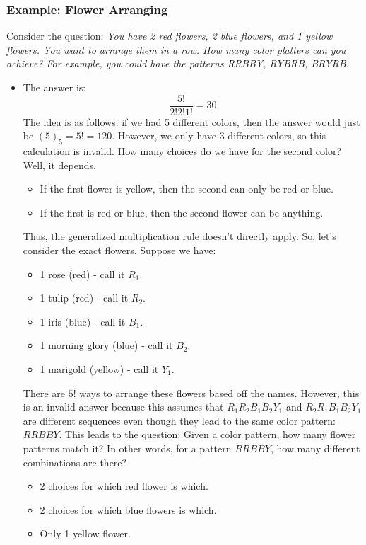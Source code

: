 \documentclass[letterpaper]{article}
\begin{document}
\subsubsection{Example: Flower Arranging}
Consider the question: \emph{You have 2 red flowers, 2 blue flowers, and 1 yellow flowers. You want to arrange them in a row. How many color platters can you achieve? For example, you could have the patterns RRBBY, RYBRB, BRYRB.} 

\begin{itemize}
    \item The answer is:
    \[\frac{5!}{2!2!1!} = 30\]
    The idea is as follows: if we had 5 different colors, then the answer would just be $(5)_5 = 5! = 120$. However, we only have 3 different colors, so this calculation is invalid. How many choices do we have for the second color? Well, it depends.
    \begin{itemize}
        \item If the first flower is yellow, then the second can only be red or blue.
        \item If the first is red or blue, then the second flower can be anything.
    \end{itemize}
    Thus, the generalized multiplication rule doesn't directly apply. So, let's consider the exact flowers. Suppose we have:
    \begin{itemize}
        \item 1 rose (red) - call it $R_1$. 
        \item 1 tulip (red) - call it $R_2$. 
        \item 1 iris (blue) - call it $B_1$. 
        \item 1 morning glory (blue) - call it $B_2$. 
        \item 1 marigold (yellow) - call it $Y_1$. 
    \end{itemize}
    There are $5!$ ways to arrange these flowers based off the names. However, this is an invalid answer because this assumes that $R_1 R_2 B_1 B_2 Y_1$ and $R_2 R_1 B_1 B_2 Y_1$ are different sequences even though they lead to the same color pattern: $RRBBY$. This leads to the question: Given a color pattern, how many flower patterns match it? In other words, for a pattern $RRBBY$, how many different combinations are there? 
    \begin{itemize}
        \item 2 choices for which red flower is which. 
        \item 2 choices for which blue flowers is which.
        \item Only 1 yellow flower. 
    \end{itemize}
    

\end{itemize}
\end{document}

